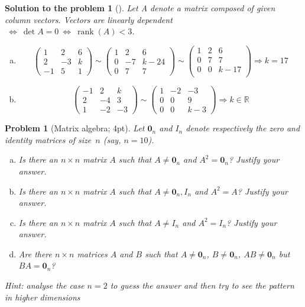 \documentclass[12pt,a4]{article}
\newtheorem{problem}{Problem}
\newtheorem{solution}{Solution to the problem}
\newcommand\rank{\operatorname{rank}}
\begin{document}
\begin{solution}[]\rm Let A denote a matrix composed of given column vectors. Vectors are linearly dependent $~\Leftrightarrow~\det A = 0~\Leftrightarrow~\rank(A) < 3$.
\begin{enumerate}[(a)]
\item
\[
\begin{pmatrix}
1 & 2 & 6\\
2 & -3 & k\\
-1 & 5 & 1
\end{pmatrix}
\sim
\begin{pmatrix}
1 & 2 & 6\\
0 & -7 & k-24\\
0 & 7 & 7
\end{pmatrix}
\sim
\begin{pmatrix}
1 & 2 & 6\\
0 & 7 & 7 \\
0 & 0 & k-17\\
\end{pmatrix}
\Rightarrow k =17
\]
\item
\[
\begin{pmatrix}
-1 & 2 & k\\
2 & -4 & 3\\
1 & -2 & -3
\end{pmatrix}
\sim
\begin{pmatrix}
1 & -2 & -3\\
0 & 0 & 9\\
0 & 0 & k-3
\end{pmatrix}
\Rightarrow k \in \mathbb{R}
\]
\end{enumerate}
\end{solution}


\begin{problem}[Matrix algebra; 4pt]\rm 
	Let $\mathbf{0}_n$  and $I_n$ denote respectively the zero and identity matrices of size~$n$ (say, $n=10$).
	\begin{enumerate}[(a)]
		\item Is there an $n\times n$ matrix $A$ such that $A\ne\mathbf{0}_n$ and $A^2 = \mathbf{0}_n$? Justify your answer.
		\item Is there an $n\times n$ matrix $A$ such that $A\ne\mathbf{0}_n, I_n$ and $A^2 = A$? Justify your answer.
		\item Is there an $n\times n$ matrix $A$ such that $A\ne I_n$ and $A^2 = I_n$? Justify your answer.
		\item Are there $n\times n$ matrices $A$ and $B$ such that $A\ne \mathbf{0}_n$, $B\ne\mathbf{0}_n$, $AB \ne \mathbf{0}_n$ but $BA = \mathbf{0}_n$?
	\end{enumerate}

	
\small{\textsf{Hint: analyse the case $n=2$ to guess the answer and then try to see the pattern in higher dimensions}}
\end{problem}
\end{document}
